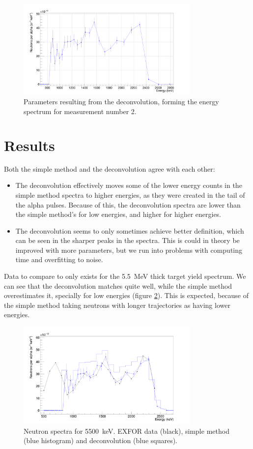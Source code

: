 \documentclass[a4paper,12pt]{report}
\begin{document}
\begin{figure}[H]
	\centering
	\includegraphics[width=0.80\textwidth]{pulsed_deconvolution.png}
	\caption{Parameters resulting from the deconvolution, forming the energy spectrum for measurement number 2.}
	\label{pulsed_deconvolution}
\end{figure}

\section{Results}
Both the simple method and the deconvolution agree with each other:
\begin{itemize}
	\item The deconvolution effectively moves some of the lower energy counts in the simple method spectra to higher energies, as they were created in the tail of the alpha pulses.
		Because of this, the deconvolution spectra are lower than the simple method's for low energies, and higher for higher energies.
	\item The deconvolution seems to only sometimes achieve better definition, which can be seen in the sharper peaks in the spectra.
		This is could in theory be improved with more parameters, but we run into problems with computing time and overfitting to noise.
\end{itemize}

Data to compare to only exists for the \qty{5.5}{\MeV} thick target yield spectrum.
We can see that the deconvolution matches quite well, while the simple method overestimates it, specially for low energies (figure \ref{pulsed_5mev}).
This is expected, because of the simple method taking neutrons with longer trajectories as having lower energies.

\begin{figure}[H]
	\centering
	\includegraphics[width=0.80\textwidth]{pulsed_5mev.png}
	\caption{Neutron spectra for \qty{5500}{\keV}.
	EXFOR data (black), simple method (blue histogram) and deconvolution (blue squares).}
	\label{pulsed_5mev}
\end{figure}
\end{document}
